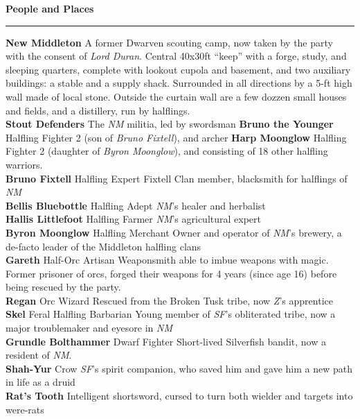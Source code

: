\documentclass[letterpaper]{article}
\newcommand{\e}[1]{\emph{#1}}
\newcommand{\B}[1]{\textbf{#1}}
\newenvironment{notesection}[1]
{ {\huge \B{#1}}\hrule\vspace{0.5em}\begingroup\fontsize{9pt}{12pt}\selectfont}
{\endgroup}
\newcommand{\person}[3]{\B{#1
    \ifstrequal{#2}{M}{{\color{ProcessBlue}\male}}{%
    \ifstrequal{#2}{F}{\color{VioletRed}\female}{}}}{\scriptsize #3}}
\begin{document}
\begin{notesection}{People and Places}
\B{New Middleton} A former Dwarven scouting camp, now taken by the party with the consent of \e{Lord Duran}.  Central 40x30ft ``keep'' with a forge, study, and sleeping quarters, complete with lookout cupola and basement, and two auxiliary buildings: a stable and a supply shack. Surrounded in all directions by a 5-ft high wall made of local stone. Outside the curtain wall are a few dozzen small houses and fields, and a distillery, run by halflings. \\
\B{Stout Defenders} The \e{NM} militia, led by swordsman \person{Bruno the Younger}{M}{Halfling Fighter 2} (son of \e{Bruno Fixtell}), and archer \person{Harp Moonglow}{F}{Halfling Fighter 2} (daughter of \e{Byron Moonglow}), and consisting of 18 other halfling warriors.\\
\person{Bruno Fixtell}{M}{Halfling Expert} Fixtell Clan member, blacksmith for halflings of \e{NM} \\
\person{Bellis Bluebottle}{F}{Halfling Adept} \e{NM}'s healer and herbalist \\
\person{Hallis Littlefoot}{F}{Halfling Farmer} \e{NM}'s agricultural expert \\
\person{Byron Moonglow}{M}{Halfling Merchant} Owner and operator of \e{NM}'s brewery, a de-facto leader of the Middleton halfling clans \\
\person{Gareth}{M}{Half-Orc Artisan} Weaponsmith able to imbue weapons with magic. Former prisoner of orcs, forged their weapons for 4 years (since age 16) before being rescued by the party. \\
\person{Regan}{M}{Orc Wizard} Rescued from the Broken Tusk tribe, now \e{Z}'s apprentice \\
\person{Skel}{M}{Feral Halfling Barbarian} Young member of \e{SF}'s obliterated tribe, now a major troublemaker and eyesore in \e{NM} \\
\person{Grundle Bolthammer}{F}{Dwarf Fighter} Short-lived Silverfish bandit, now a resident of \e{NM}.\\
\person{Shah-Yur}{M}{Crow} \e{SF}'s spirit companion, who saved him and gave him a new path in life as a druid\\
\B{Rat's Tooth} Intelligent shortsword, cursed to turn both wielder and targets into were-rats\\


\end{notesection}
\end{document}
